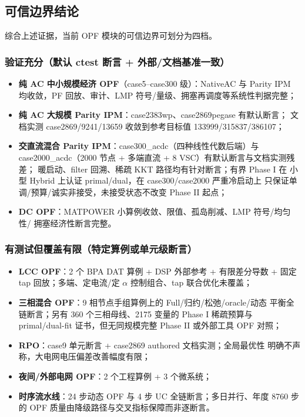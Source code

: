 \subsection{可信边界结论}\label{subsec:ver:boundary}

综合上述证据，当前 OPF 模块的可信边界可划分为四档。

\subsubsection*{验证充分（默认 ctest 断言 + 外部/文档基准一致）}
\begin{itemize}
  \item \textbf{纯 AC 中小规模经济 OPF}（case5--case300 级）：NativeAC 与 Parity IPM
        均收敛，PF 回放、审计、LMP 符号/量级、拥塞再调度等系统性判据完整；
  \item \textbf{纯 AC 大规模 Parity IPM}：case2383wp、case2869pegase 有默认断言；
        文档实测 case2869/9241/13659 收敛到参考目标值 133999/315837/386107；
  \item \textbf{交直流混合 Parity IPM}：case300\_acdc（四种线性代数后端）与
        case2000\_acdc（2000 节点 + 多端直流 + 8 VSC）有默认断言与文档实测残差；
        暖启动、filter 回溯、稀疏 KKT 路径均有针对断言；有界 Phase I 在
        小型 Hybrid 上认证 primal/dual，在 case300/case2000 严重冷启动上
        只保证单调/预算/诚实非接受，未接受状态不改变 Phase II 起点；
  \item \textbf{DC OPF}：MATPOWER 小算例收敛、限值、孤岛削减、LMP 符号/均匀性/
        拥塞经济性断言完整。
\end{itemize}

\subsubsection*{有测试但覆盖有限（特定算例或单元级断言）}
\begin{itemize}
  \item \textbf{LCC OPF}：2 个 BPA DAT 算例 + DSP 外部参考 + 有限差分导数 + 固定
        tap 回放；多端、定电流/定 $\alpha$ 控制组合、tap 联合优化未覆盖；
  \item \textbf{三相混合 OPF}：9 相节点手组算例上的 Full/归约/松弛/oracle/动态
        平衡全链断言；另有 360 个三相母线、2175 变量的 Phase I 稀疏预算与
        primal/dual-fit 证书，但无同规模完整 Phase II 或外部工具 OPF 对照；
  \item \textbf{RPO}：case9 单元断言 + case2869 authored 文档实测；全局最优性
        明确不声称，大电网电压偏差改善幅度有限；
  \item \textbf{夜间/外部电网 OPF}：2 个工程算例 + 3 个微系统；
  \item \textbf{时序流水线}：24 步动态 OPF 与 4 步 UC 全链断言；多日并行、年度
        8760 步的 OPF 质量由降级路径与交叉指标保障而非逐断言。
\end{itemize}


